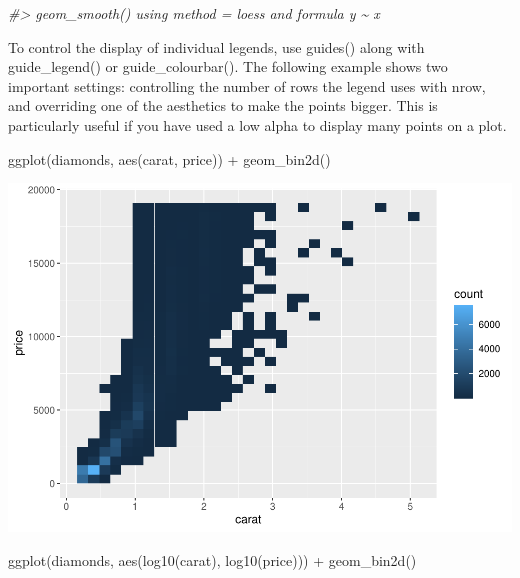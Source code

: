 \documentclass[
]{article}
\newenvironment{Shaded}{\begin{snugshade}}{\end{snugshade}}
\newcommand{\CommentTok}[1]{\textcolor[rgb]{0.56,0.35,0.01}{\textit{#1}}}
\newcommand{\FunctionTok}[1]{\textcolor[rgb]{0.00,0.00,0.00}{#1}}
\newcommand{\NormalTok}[1]{#1}
\newcommand{\SpecialCharTok}[1]{\textcolor[rgb]{0.00,0.00,0.00}{#1}}
\begin{document}
\begin{Shaded}
\begin{Highlighting}[]
\CommentTok{\#\textgreater{} \textasciigrave{}geom\_smooth()\textasciigrave{} using method = \textquotesingle{}loess\textquotesingle{} and formula \textquotesingle{}y \textasciitilde{} x\textquotesingle{}}
\end{Highlighting}
\end{Shaded}

To control the display of individual legends, use guides() along with
guide\_legend() or guide\_colourbar(). The following example shows two
important settings: controlling the number of rows the legend uses with
nrow, and overriding one of the aesthetics to make the points bigger.
This is particularly useful if you have used a low alpha to display many
points on a plot.

\begin{Shaded}
\begin{Highlighting}[]
\FunctionTok{ggplot}\NormalTok{(diamonds, }\FunctionTok{aes}\NormalTok{(carat, price)) }\SpecialCharTok{+}
  \FunctionTok{geom\_bin2d}\NormalTok{()}
\end{Highlighting}
\end{Shaded}

\includegraphics{Journal_files/figure-latex/unnamed-chunk-58-1.pdf}

\begin{Shaded}
\begin{Highlighting}[]
\FunctionTok{ggplot}\NormalTok{(diamonds, }\FunctionTok{aes}\NormalTok{(}\FunctionTok{log10}\NormalTok{(carat), }\FunctionTok{log10}\NormalTok{(price))) }\SpecialCharTok{+}
  \FunctionTok{geom\_bin2d}\NormalTok{()}
\end{Highlighting}
\end{Shaded}
\end{document}
